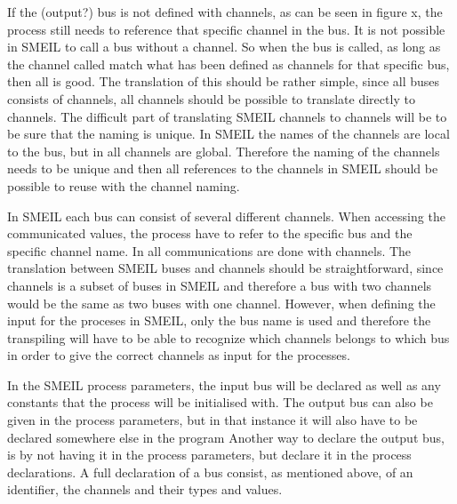 If the (output?) bus is not defined with channels, as can be seen in figure x,
the process still needs to reference that specific channel in the bus. It is not possible in SMEIL to call a bus without a channel. So when the bus is called, as long as the channel called match what has been defined as channels for that specific bus, then all is good. The translation of this should be rather simple, since all buses consists of channels, all channels should be possible to translate directly to \cspm channels.
The difficult part of translating SMEIL channels to \cspm channels will be to be sure that the naming is unique. In SMEIL the names of the channels are local to the bus, but in \cspm all channels are global. Therefore the naming of the channels needs to be unique and then all references to the channels in SMEIL should be possible to reuse with the \cspm channel naming.


In SMEIL each bus can consist of several different channels. When accessing the communicated values, the process have to refer to the specific bus and the specific channel name. In \cspm all communications are done with channels. The translation between SMEIL buses and \cspm channels should be straightforward, since channels is a subset of buses in SMEIL and therefore a bus with two channels would be the same as two buses with one channel. However, when defining the input for the proceses in SMEIL, only the bus name is used and therefore the transpiling will have to be able to recognize which channels belongs to which bus in order to give the correct channels as input for the \cspm processes.



In the SMEIL process parameters, the input bus will be declared as well as any constants that the process will be initialised with. The output bus can also be given in the process parameters, but in that instance it will also have to be declared somewhere else in the program
Another way to declare the output bus, is by not having it in the process parameters, but declare it in the process declarations.
A full declaration of a bus consist, as mentioned above, of an identifier, the channels and their types and values.

